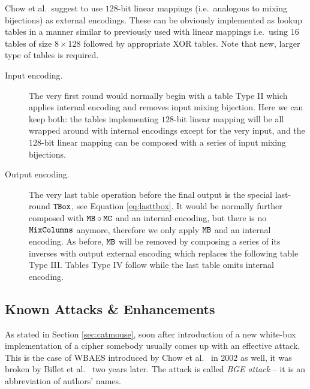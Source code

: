 	Chow et al.\ suggest to use $128$-bit linear mappings (i.e.\ analogous to mixing bijections) as external encodings. These can be obviously implemented as lookup tables in a manner similar to previously used with linear mappings i.e.\ using $16$ tables of size $8\times 128$ followed by appropriate XOR tables. Note that new, larger type of tables is required.
	
	\begin{description}
		\item[Input encoding.] The very first round would normally begin with a table Type II which applies internal encoding and removes input mixing bijection. Here we can keep both: the tables implementing $128$-bit linear mapping will be all wrapped around with internal encodings except for the very input, and the $128$-bit linear mapping can be composed with a series of input mixing bijections.
		\item[Output encoding.] The very last table operation before the final output is the special last-round $\texttt{TBox}$, see Equation \ref{eq:lasttbox}. It would be normally further composed with $\texttt{MB}\circ\texttt{MC}$ and an internal encoding, but there is no $\texttt{MixColumns}$ anymore, therefore we only apply $\texttt{MB}$ and an internal encoding. As before, $\texttt{MB}$ will be removed by composing a series of its inverses with output external encoding which replaces the following table Type III. Tables Type IV follow while the last table omits internal encoding.
	\end{description}
	



\subsection{Known Attacks \& Enhancements}
\label{sec:known}

As stated in Section \ref{sec:catmouse}, soon after introduction of a new white-box implementation of a cipher somebody usually comes up with an effective attack. This is the case of WBAES introduced by Chow et al.\ \cite{chow2002aes} in 2002 as well, it was broken by Billet et al.\ \cite{billet2004cryptanalysis} two years later. The attack is called {\em BGE attack} -- it is an abbreviation of authors' names.

